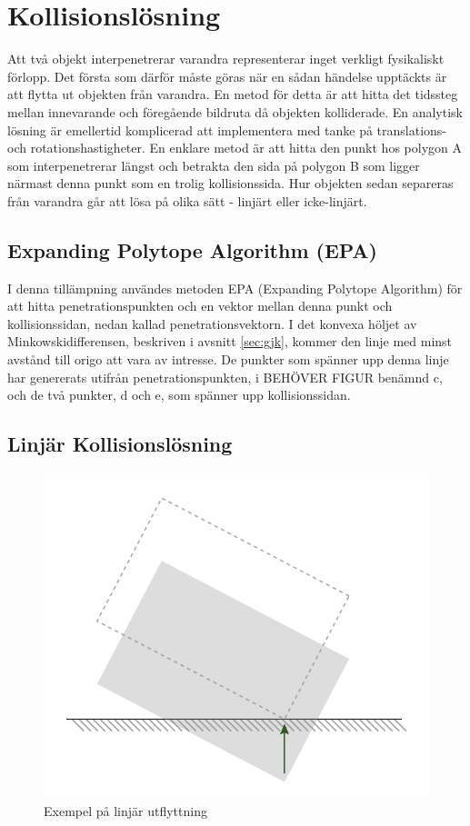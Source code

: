\documentclass[a4paper,12pt,twopage,swedish]{article}
\begin{document}
\section{Kollisionslösning}
Att två objekt interpenetrerar varandra representerar inget verkligt fysikaliskt förlopp. Det första som därför måste göras när en sådan händelse upptäckts är att flytta ut objekten från varandra. En metod för detta är att hitta det tidssteg mellan innevarande och föregående bildruta då objekten kolliderade. En analytisk lösning är emellertid komplicerad att implementera med tanke på translations- och rotationshastigheter. En enklare metod är att hitta den punkt hos polygon A som interpenetrerar längst och betrakta den sida på polygon B som ligger närmast denna punkt som en trolig kollisionssida. Hur objekten sedan separeras från varandra går att lösa på olika sätt - linjärt eller icke-linjärt.

\subsection{Expanding Polytope Algorithm (EPA)}
I denna tillämpning användes metoden EPA (Expanding Polytope Algorithm) för att hitta penetrationspunkten och en vektor mellan denna punkt och kollisionssidan, nedan kallad penetrationsvektorn. I det konvexa höljet av Minkowskidifferensen, beskriven i avsnitt \ref{sec:gjk}, kommer den linje med minst avstånd till origo att vara av intresse. De punkter som spänner upp denna linje har genererats utifrån penetrationspunkten, i  BEHÖVER FIGUR benämnd c, och de två punkter, d och e, som spänner upp kollisionssidan.


\subsection{Linjär Kollisionslösning}

\begin{figure}[H]
	\centering
	\includegraphics{illustrations/linear.pdf}
	\caption{Exempel på linjär utflyttning}
	\label{fig:linear}
\end{figure}
\end{document}
